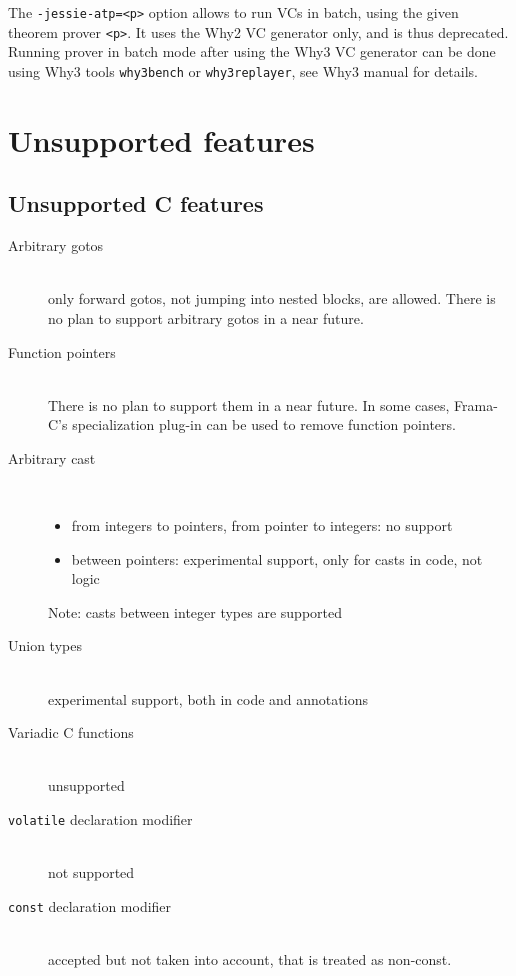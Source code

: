 \documentclass[a4paper,11pt,twoside,openright]{report}
\begin{document}
The \verb|-jessie-atp=<p>| option allows to run VCs in batch, using
the given theorem prover \texttt{<p>}. It uses the Why2 VC
generator only, and is thus deprecated. Running prover in batch mode
after using the Why3 VC generator can be done using Why3 tools
\verb|why3bench| or \verb|why3replayer|, see Why3 manual for details.


\section{Unsupported features}

\subsection{Unsupported C features}

\begin{description}
\item[Arbitrary gotos] ~\\
  only forward gotos, not jumping into nested
  blocks, are allowed. There is no plan to support arbitrary gotos in
  a near future.
\item[Function pointers] ~\\
  There is no plan to support them in a near
  future. In some cases, Frama-C's specialization plug-in can be used to
  remove function pointers.
\item[Arbitrary cast] ~\\
  \begin{itemize}
  \item from integers to pointers, from pointer to integers: no support
  \item between pointers: experimental support, only for casts in code, not logic
  \end{itemize}
  Note: casts between integer types are supported
\item[Union types] ~\\
  experimental support, both in code and annotations
\item[Variadic C functions] ~\\
  unsupported

\item[\texttt{volatile} declaration modifier]~\\
  not supported
\item[\texttt{const} declaration modifier]~\\
  accepted but not taken into account, that is treated as non-const.

\end{description}
\end{document}
